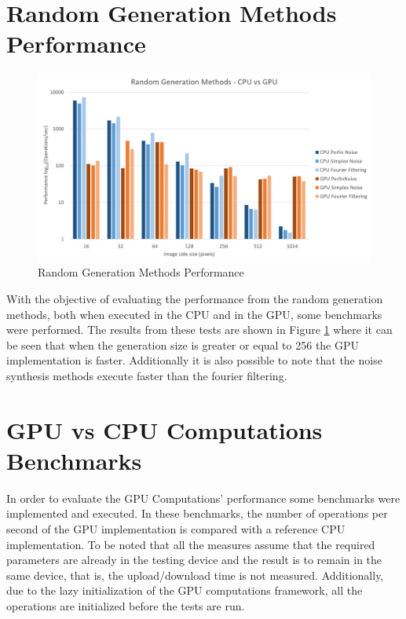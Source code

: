   \section{Random Generation Methods Performance}

    \begin{figure}[H]
      \centering
      \includegraphics[width=\plotwidth]{images/results/benchmarks/plot-rgm}
      \caption{Random Generation Methods Performance}
      \label{fig:plot-rgm}
    \end{figure}
    
    With the objective of evaluating the performance from the random generation methods, both when executed in the CPU and in the GPU, some benchmarks were performed. The results from these tests are shown in Figure \ref{fig:plot-rgm} where it can be seen that when the generation size is greater or equal to 256 the GPU implementation is faster. Additionally it is also possible to note that the noise synthesis methods execute faster than the fourier filtering.
  
  \section {GPU vs CPU Computations Benchmarks} \label{sec:res:benchmarks}
    
    In order to evaluate the GPU Computations' performance some benchmarks were implemented and executed. In these benchmarks, the number of operations per second of the GPU implementation is compared with a reference CPU implementation. To be noted that all the measures assume that the required parameters are already in the testing device and the result is to remain in the same device, that is, the upload/download time is not measured. Additionally, due to the lazy initialization of the GPU computations framework, all the operations are initialized before the tests are run. 
    
